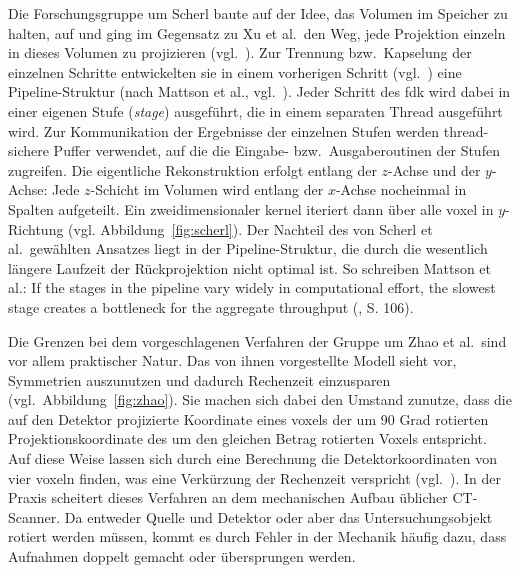 Die Forschungsgruppe um Scherl baute auf der Idee, das Volumen im Speicher zu halten, auf und ging im Gegensatz zu Xu et
al.\ den Weg, jede Projektion einzeln in dieses Volumen zu projizieren (vgl.~\cite{scherlkeck}). Zur Trennung bzw.\
Kapselung der einzelnen Schritte entwickelten sie in einem vorherigen Schritt (vgl.~\cite{scherlhopp}) eine
Pipeline-Struktur (nach Mattson et al., vgl.~\cite{mattsan}). Jeder Schritt des \gls{fdk} wird dabei in einer eigenen
Stufe (\textit{stage}) ausgeführt, die in einem separaten Thread ausgeführt wird. Zur Kommunikation der Ergebnisse der
einzelnen Stufen werden thread-sichere Puffer verwendet, auf die die Eingabe- bzw.\ Ausgaberoutinen der Stufen
zugreifen. Die eigentliche Rekonstruktion erfolgt entlang der $z$-Achse und der $y$-Achse: Jede $z$-Schicht im Volumen
wird entlang der $x$-Achse nocheinmal in Spalten aufgeteilt. Ein zweidimensionaler \gls{kernel} iteriert dann über alle
\gls{voxel} in $y$-Richtung (vgl. Abbildung~\ref{fig:scherl}). Der Nachteil des von Scherl et al.\ gewählten Ansatzes
liegt in der Pipeline-Struktur, die durch die wesentlich längere Laufzeit der Rückprojektion nicht optimal ist. So
schreiben Mattson et al.: {\glqq}If the stages in the pipeline vary widely in computational effort, the slowest stage
creates a bottleneck for the aggregate throughput{\grqq} (\cite{mattsan}, S. 106).

Die Grenzen bei dem vorgeschlagenen Verfahren der Gruppe um Zhao et al.\ sind vor allem praktischer Natur. Das von ihnen
vorgestellte Modell sieht vor, Symmetrien auszunutzen und dadurch Rechenzeit einzusparen (vgl.\
Abbildung~\ref{fig:zhao}). Sie machen sich dabei den Umstand zunutze, dass die auf den Detektor projizierte Koordinate
eines \gls{voxel}s der um 90 Grad rotierten Projektionskoordinate des um den gleichen Betrag rotierten Voxels
entspricht. Auf diese Weise lassen sich durch eine Berechnung die Detektorkoordinaten von vier \gls{voxel}n finden, was
eine Verkürzung der Rechenzeit verspricht (vgl.~\cite{zhao}). In der Praxis scheitert dieses Verfahren an dem
mechanischen Aufbau üblicher CT-Scanner. Da entweder Quelle und Detektor oder aber das Untersuchungsobjekt rotiert
werden müssen, kommt es durch Fehler in der Mechanik häufig dazu, dass Aufnahmen doppelt gemacht oder übersprungen
werden.

